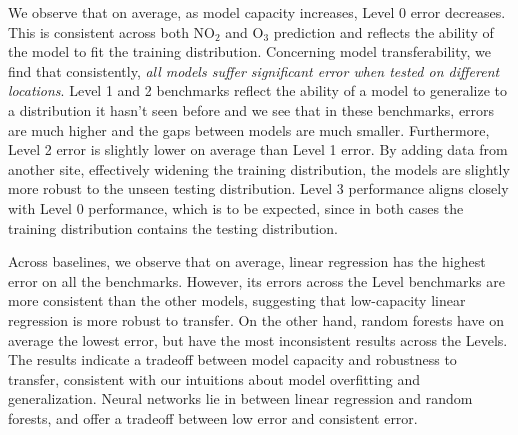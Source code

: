 \documentclass[journal abbreviation, manuscript]{copernicus}
\newcommand{\textus}[1]{$_{\text{#1}}$}
\begin{document}
We observe that on average, as model capacity increases, Level 0 error decreases. This is consistent across both NO\textus{2} and O\textus{3} prediction and reflects the ability of the model to fit the training distribution. Concerning model transferability, we find that consistently, \emph{all models suffer significant error when tested on different locations}. Level 1 and 2 benchmarks reflect the ability of a model to generalize to a distribution it hasn't seen before and we see that in these benchmarks, errors are much higher and the gaps between models are much smaller. Furthermore, Level 2 error is slightly lower on average than Level 1 error. By adding data from another site, effectively widening the training distribution, the models are slightly more robust to the unseen testing distribution. Level 3 performance aligns closely with Level 0 performance, which is to be expected, since in both cases the training distribution contains the testing distribution.

Across baselines, we observe that on average, linear regression has the highest error on all the benchmarks. However, its errors across the Level benchmarks are more consistent than the other models, suggesting that low-capacity linear regression is more robust to transfer. On the other hand, random forests have on average the lowest error, but have the most inconsistent results across the Levels. The results indicate a tradeoff between model capacity and robustness to transfer, consistent with our intuitions about model overfitting and generalization. Neural networks lie in between linear regression and random forests, and offer a tradeoff between low error and consistent error. 

\iffalse
\end{document}
